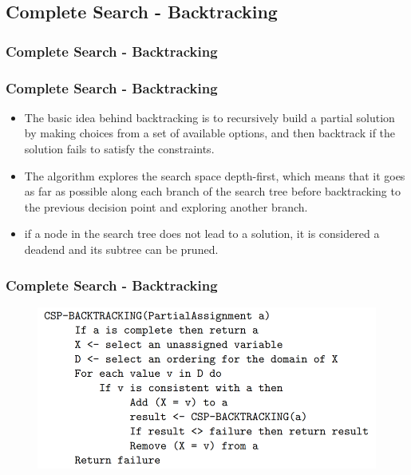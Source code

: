 \documentclass[
	11pt,
]{beamer}
\begin{document}
\subsection{Complete Search - Backtracking}
\begin{frame}
    \frametitle{Complete Search - Backtracking}
    \begin{center}
    \end{center}
\end{frame}
\begin{frame}
	\frametitle{Complete Search - Backtracking}
	\begin{itemize}
		\item The basic idea behind backtracking is to recursively build a partial solution by making choices from a set of available options, and then backtrack if the solution fails to satisfy the constraints. 
		\bigskip
		\item The algorithm explores the search space depth-first, which means that it goes as far as possible along each branch of the search tree before backtracking to the previous decision point and exploring another branch.
		\bigskip
        \item if a node in the search tree does not lead to a solution, it is considered a deadend and its subtree can be pruned. 
	\end{itemize}
\end{frame}
\begin{frame}
	\frametitle{Complete Search - Backtracking}
    \begin{figure}
        \centering
        \includegraphics[scale=0.4]{Figs/pcode_1.png}
        \end{figure}
        
\end{frame}
\end{document}
